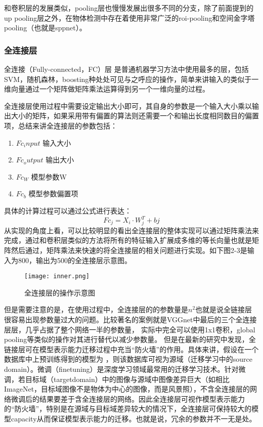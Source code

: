 和卷积层的发展类似，pooling层也慢慢发展出很多不同的分支，除了前面提到的 up pooling层之外，在物体检测中存在着使用非常广泛的roi-pooling\cite{ROIPOOLING}和空间金字塔pooling（也就是sppnet）\cite{SPPNET}。
\subsubsection{全连接层}
全连接（Fully-connected，FC）层
是普通机器学习方法中使用最多的层，包括SVM，随机森林，boosting种处处可见与之呼应的操作，简单来讲输入的类似于一维向量通过一个矩阵做矩阵乘法运算得到另一个一维向量的过程。

全连接层使用过程中需要设定输出大小即可，其自身的参数是一个输入大小乘以输出大小的矩阵，如果采用带有偏置的算法则还需要一个和输出长度相同数目的偏置项，总结来讲全连接层的参数包括：
\begin{enumerate}
\item $Fc_input$  输入大小
\item $Fc_output$ 输出大小
\item $Fc_W$ 		  模型参数W
\item $Fc_b$ 		  模型参数偏置项
\end{enumerate}

具体的计算过程可以通过公式进行表达：
\begin{equation}{
Fc_j=X_i·W_j^T+bj
}
\end{equation}
从实现的角度上看，可以比较明显的看出全连接层的整体实现可以通过矩阵乘法来完成，通过和卷积层类似的方法将所有的特征输入扩展成多维的等长向量也就是矩阵然后通过，矩阵乘法来快速的将全连接层的相关问题进行实现。如下图2-3是输入为800，输出为500的全连接层示意图。
\begin{figure}[!ht]
 \centering
	\texttt{[image: inner.png]}
	\caption{全连接层的操作示意图}
\end{figure}

但是需要注意的是，在使用过程中，全连接层的的参数量是$n^2$也就是说全链接层很容易出现参数量过大的问题。比较著名的案例就是VGGnet\cite{VGGNET}中最后的三个全连接层层，几乎占据了整个网络一半的参数量，
实际中完全可以使用1x1卷积\cite{1x1CONV}，global pooling\cite{1x1CONV}等类似的操作对其进行替代以减少参数量。
但是在最新的研究中发现，全链接层可在模型表示能力迁移过程中充当“防火墙”的作用。具体来讲，假设在一个数据库中上预训练得到的模型为 ，则该数据库可视为源域（迁移学习中的source domain）。微调（finetuning）是深度学习领域最常用的迁移学习技术。针对微调，若目标域（targetdomain）中的图像与源域中图像差异巨大（如相比ImageNet，目标域图像不是物体为中心的图像，而是风景照），不含全连接层的网络微调后的结果要差于含全连接层的网络。因此全连接层可视作模型表示能力的“防火墙”，特别是在源域与目标域差异较大的情况下，全连接层可保持较大的模型capacity从而保证模型表示能力的迁移。也就是说，冗余的参数并不一无是处\cite{FCGOOD}。
